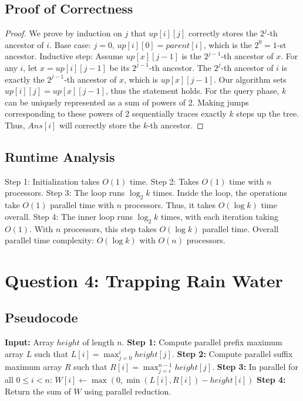 \documentclass{article}
\begin{document}
\subsection{Proof of Correctness}
\begin{proof}
We prove by induction on $j$ that $up[i][j]$ correctly stores the $2^j$-th ancestor of $i$.
Base case: $j=0$, $up[i][0] = parent[i]$, which is the $2^0=1$-st ancestor.
Inductive step: Assume $up[x][j-1]$ is the $2^{j-1}$-th ancestor of $x$. For any $i$, let $x = up[i][j-1]$ be its $2^{j-1}$-th ancestor. The $2^j$-th ancestor of $i$ is exactly the $2^{j-1}$-th ancestor of $x$, which is $up[x][j-1]$. Our algorithm sets $up[i][j] = up[x][j-1]$, thus the statement holds.
For the query phase, $k$ can be uniquely represented as a sum of powers of 2. Making jumps corresponding to these powers of 2 sequentially traces exactly $k$ steps up the tree. Thus, $Ans[i]$ will correctly store the $k$-th ancestor.
\end{proof}

\subsection{Runtime Analysis}
Step 1: Initialization takes $O(1)$ time.
Step 2: Takes $O(1)$ time with $n$ processors.
Step 3: The loop runs $\log_2 k$ times. Inside the loop, the operations take $O(1)$ parallel time with $n$ processors. Thus, it takes $O(\log k)$ time overall.
Step 4: The inner loop runs $\log_2 k$ times, with each iteration taking $O(1)$. With $n$ processors, this step takes $O(\log k)$ parallel time.
Overall parallel time complexity: $O(\log k)$ with $O(n)$ processors.

\section{Question 4: Trapping Rain Water}

\subsection{Pseudocode}
\begin{algorithm}
\caption{Parallel Trapping Rain Water}
\begin{algorithmic}[1]
\State \textbf{Input:} Array $height$ of length $n$.
\State \textbf{Step 1:} Compute parallel prefix maximum array $L$ such that $L[i] = \max_{j=0}^i height[j]$.
\State \textbf{Step 2:} Compute parallel suffix maximum array $R$ such that $R[i] = \max_{j=i}^{n-1} height[j]$.
\State \textbf{Step 3:} In parallel for all $0 \le i < n$:
\State \quad $W[i] \gets \max(0, \min(L[i], R[i]) - height[i])$
\State \textbf{Step 4:} Return the sum of $W$ using parallel reduction.
\end{algorithmic}
\end{algorithm}
\end{document}
